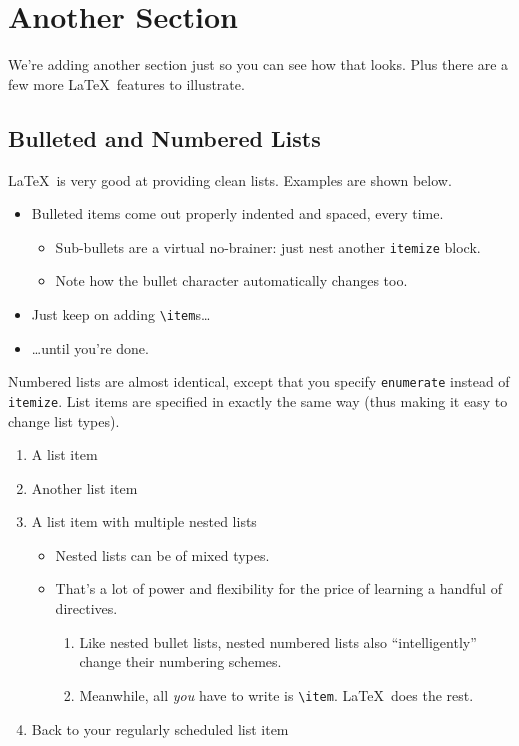 \documentclass{article}
\begin{document}
\section{Another Section}

We're adding another section just so you can see how that looks.  Plus there are a few more \LaTeX\ features to illustrate.

\subsection{Bulleted and Numbered Lists}

\LaTeX\ is very good at providing clean lists.  Examples are shown below.

\begin{itemize}
\item Bulleted items come out properly indented and spaced, every time.

\begin{itemize}
\item Sub-bullets are a virtual no-brainer: just nest another \verb!itemize! block.
\item Note how the bullet character automatically changes too.
\end{itemize}

\item Just keep on adding \verb!\item!s\ldots

\item \ldots until you're done.
\end{itemize}

Numbered lists are almost identical, except that you specify \verb!enumerate! instead of \verb!itemize!.  List items are specified in exactly the same way (thus making it easy to change list types).

\begin{enumerate}
\item A list item
\item Another list item
\item A list item with multiple nested lists

\begin{itemize}
\item Nested lists can be of mixed types.
\item That's a lot of power and flexibility for the price of learning a handful of directives.

\begin{enumerate}
\item Like nested bullet lists, nested numbered lists also ``intelligently'' change their numbering schemes.
\item Meanwhile, all \emph{you} have to write is \verb!\item!.  \LaTeX\ does the rest.
\end{enumerate}
\end{itemize}

\item Back to your regularly scheduled list item

\end{enumerate}
\end{document}
